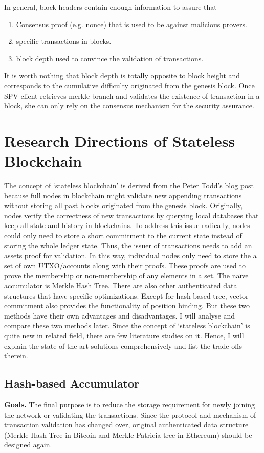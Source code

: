 \documentclass[conference]{IEEEtran}
\begin{document}
In general, block headers contain enough information to assure that 
\begin{enumerate}
  \item Consensus proof (e.g. nonce) that is used to be against malicious provers.
  \item specific transactions in blocks.
  \item block depth used to convince the validation of transactions.
\end{enumerate}

It is worth nothing that block depth is totally opposite to block height and corresponds to the cumulative difficulty originated from the genesis block.
%
Once SPV client retrieves merkle branch and validates the existence of transaction in a block, she can only rely on the consensus mechanism for the security assurance. 


\section{Research Directions of Stateless Blockchain}
%
The concept of `stateless blockchain' is derived from the Peter Todd's blog post~\cite{Tod,MMR} because full nodes in blockchain might validate new appending transactions without storing all past blocks originated from the genesis block.
%
Originally, nodes verify the correctness of new transactions by querying local databases that keep all state and history in blockchains.
%
To address this issue radically, nodes could only need to store a short commitment to the current state instead of storing the whole ledger state.
%
Thus, the issuer of transactions needs to add an assets proof for validation. 
%
In this way, individual nodes only need to store the a set of own UTXO/accounts along with their proofs.
%
These proofs are used to prove the membership or non-membership of any elements in a set.
%
The na\"ive accumulator is Merkle Hash Tree.
%
There are also other authenticated data structures that have specific optimizations.
%
Except for hash-based tree, vector commitment also provides the functionality of position binding.
%
But these two methods have their own advantages and disadvantages.
%
I will analyse and compare these two methods later.
%
Since the concept of `stateless blockchain' is quite new in related field, there are few literature studies on it.
%
Hence, I will explain the state-of-the-art solutions comprehensively and list the trade-offs therein.


\subsection{Hash-based Accumulator}
\textbf{Goals.} The final purpose is to reduce the storage requirement for newly joining the network or validating the transactions.
%
Since the protocol and mechanism of transaction validation has changed over, original authenticated data structure (Merkle Hash Tree in Bitcoin and Merkle Patricia tree in Ethereum) should be designed again. 
\end{document}
